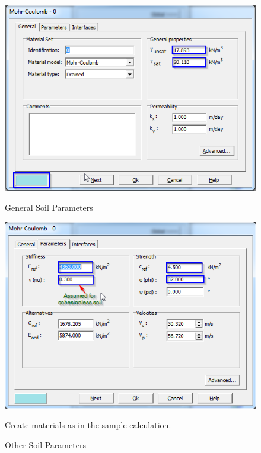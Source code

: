 \begin{landscape}
\begin{figure}[hbtp]
\begin{minipage}[c]{0.4\linewidth}
  \includegraphics[width=\linewidth, height=0.4\textheight,keepaspectratio]{images/plx/a (6).png}
  \caption{General Soil Parameters}
  \vfill
  \includegraphics[width=\linewidth, height=0.4\textheight,keepaspectratio]{images/plx/a (7).png}
  \caption{Other Soil Parameters}
  \end{minipage}
  \hfill
  \begin{minipage}[c]{0.2\linewidth}
   Create materials as in the sample calculation.
  \end{minipage}
\end{figure}
\end{landscape}
\pagebreak

